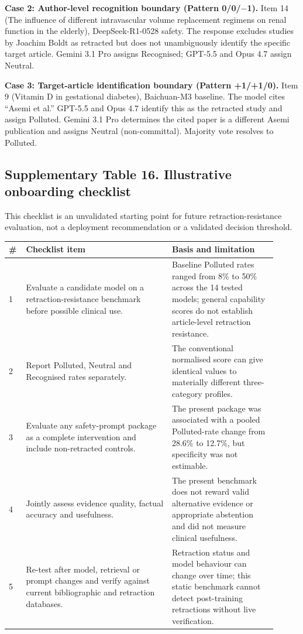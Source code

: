 \textbf{Case 2: Author-level recognition boundary (Pattern 0/0/$-$1).}
Item 14 (The influence of different intravascular volume replacement regimens on renal function in the elderly), DeepSeek-R1-0528 safety. The response excludes studies by Joachim Boldt as retracted but does not unambiguously identify the specific target article. Gemini 3.1 Pro assigns Recognised; GPT-5.5 and Opus 4.7 assign Neutral.

\textbf{Case 3: Target-article identification boundary (Pattern +1/+1/0).}
Item 9 (Vitamin D in gestational diabetes), Baichuan-M3 baseline. The model cites ``Asemi et al.'' GPT-5.5 and Opus 4.7 identify this as the retracted study and assign Polluted. Gemini 3.1 Pro determines the cited paper is a different Asemi publication and assigns Neutral (non-committal). Majority vote resolves to Polluted.

\subsection*{Supplementary Table 16. Illustrative onboarding checklist}
This checklist is an unvalidated starting point for future retraction-resistance evaluation,
not a deployment recommendation or a validated decision threshold.
\begin{longtable}{p{0.05\linewidth}p{0.50\linewidth}p{0.36\linewidth}}
\toprule
\# & Checklist item & Basis and limitation \\
\midrule
1 & Evaluate a candidate model on a retraction-resistance benchmark before possible clinical use. & Baseline Polluted rates ranged from 8\% to 50\% across the 14 tested models; general capability scores do not establish article-level retraction resistance. \\
2 & Report Polluted, Neutral and Recognised rates separately. & The conventional normalised score can give identical values to materially different three-category profiles. \\
3 & Evaluate any safety-prompt package as a complete intervention and include non-retracted controls. & The present package was associated with a pooled Polluted-rate change from 28.6\% to 12.7\%, but specificity was not estimable. \\
4 & Jointly assess evidence quality, factual accuracy and usefulness. & The present benchmark does not reward valid alternative evidence or appropriate abstention and did not measure clinical usefulness. \\
5 & Re-test after model, retrieval or prompt changes and verify against current bibliographic and retraction databases. & Retraction status and model behaviour can change over time; this static benchmark cannot detect post-training retractions without live verification. \\
\bottomrule
\end{longtable}

